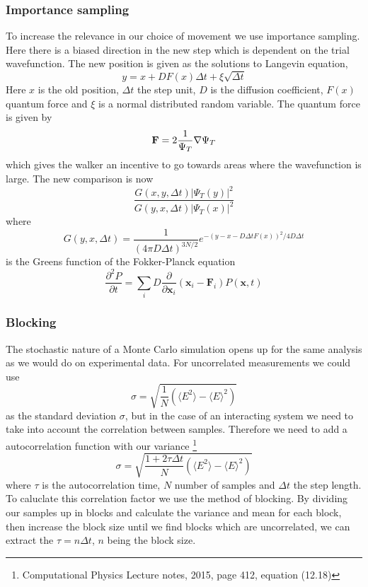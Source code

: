 \documentclass[12pt]{article}
\begin{document}
  \subsubsection{Importance sampling}
  To increase the relevance in our choice of movement we use importance sampling.
  Here there is a biased direction in the new step which is dependent on the trial wavefunction.
  The new position is given as the solutions to Langevin equation,
  \begin{equation}
    y = x + DF(x)\Delta t + \xi\sqrt{\Delta t}
  \end{equation}
  Here $x$ is the old position, $\Delta t$ the step unit, $D$ is the diffusion coefficient, 
  $F(x)$ quantum force and $\xi$ is a normal distributed random variable.
  The quantum force is given by 
  \begin{equation}
    {\bf F}= 2\frac{1}{\Psi_T}\nabla\Psi_T
  \end{equation}
  which gives the walker an incentive to go towards areas where the wavefunction is large.
  The new comparison is now
  \begin{equation}
    \frac{G(x,y,\Delta t)|\Psi_T(y)|^2}{G(y,x,\Delta t)|\Psi_T(x)|^2}
  \end{equation}
  where 
  \[ G(y,x,\Delta t) = \frac{1}{(4\pi D\Delta t)^{3N/2}}e^{-(y-x-D\Delta tF(x))^2/4D\Delta t}\]
  is the Greens function of the Fokker-Planck equation
  \[ \frac{\partial^2P}{\partial t} = \sum_i D\frac{\partial}{\partial {\bm x}_i}%
  ({\bm x}_i-{\bm F}_i)P({\bm x},t) \]

  \subsubsection{Blocking}
  The stochastic nature of a Monte Carlo simulation opens up for the same analysis as we 
  would do on experimental data. For uncorrelated measurements we could use 
  \[ \sigma = \sqrt{\frac{1}{N}(\langle E^2\rangle - \langle E\rangle^2)} \]
  as the standard deviation $\sigma$, but in the case of an interacting system we need
  to take into account the correlation between samples. Therefore we need to add a 
  autocorrelation function with our variance \cite{mjh}
  \footnote{Computational Physics Lecture notes, 2015, page 412, equation (12.18)} %
  \[ \sigma = \sqrt{\frac{1+2\tau\Delta t}{N} (\langle E^2\rangle - \langle E\rangle^2)} \]
  where $\tau$ is the autocorrelation time, $N$ number of samples and $\Delta t$ the step length. 
  To caluclate this correlation factor we use the method of blocking. By dividing our
  samples up in blocks and calculate the variance and mean for each block, then increase
  the block size until we find blocks which are uncorrelated, we can extract the $\tau = n\Delta t$,
  $n$ being the block size.
  
\end{document}
